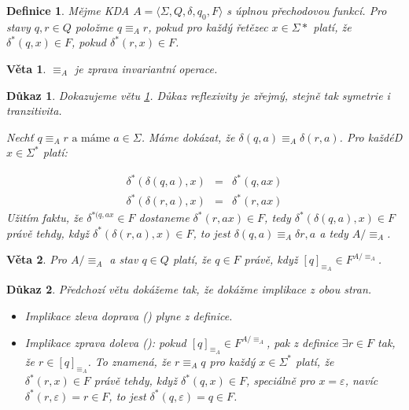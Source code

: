 \documentclass[10pt, a4paper, titlepage]{article}
\theoremstyle{note}
\newtheorem{veta}{Věta}
\newtheorem{definice}{Definice}
\newtheorem{dukaz}{Důkaz}
\begin{document}
\begin{definice}
Mějme KDA $A = \langle \Sigma, Q, \delta, q_{0}, F \rangle$ s úplnou přechodovou funkcí.
Pro stavy $q, r \in Q$ položme $q \equiv_{A} r$, pokud pro každ\'y řetězec $x \in \Sigma{*}$ plat\'i, že $\delta^{*}(q,x) \in F$,
pokud $\delta^{*}(r,x) \in F$.
\end{definice}

\begin{veta}\label{veta-zprava}
$\equiv_{A}$ je zprava invariantní operace.
\end{veta}

\begin{dukaz}
Dokazujeme větu \ref{veta-zprava}. Důkaz reflexivity je zřejm\'y, stejně tak symetrie i tranzitivita.

Nechť $q \equiv_{A} r \text{ a m\'ame } a \in \Sigma$. M\'ame dok\'azat, že $\delta(q,a) \equiv_{A} \delta(r,a)$. Pro každ\'eD
$x \in \Sigma^{*}$ plat\'i:

\begin{eqnarray*}
\delta^{*}(\delta(q,a), x) &=& \delta^{*}(q, ax) \\
\delta^{*}(\delta(r,a), x) &=& \delta^{*}(r, ax)
\end{eqnarray*}
Užit\'im faktu, že $\delta^{*(q, ax} \in F$ dostaneme $\delta^{*}(r,ax) \in F$, tedy
$\delta^{*}(\delta(q,a),x) \in F$ pr\'avě tehdy, když $\delta^{*}(\delta(r,a),x) \in F$, to jest
$\delta(q,a) \equiv_{A} \delta{r, a}$ a tedy $A/ \equiv_{A}$.
\end{dukaz}

\begin{veta}\label{veta-4}
Pro $A/ \equiv_{A}$ a stav $q \in Q$ plat\'i, že $q \in F$ pr\'avě, když $[q]_{\equiv_{A}} \in F^{A/ \equiv_{A}}$.
\end{veta}

\begin{dukaz}
Předchoz\'i větu dok\'ažeme tak, že dok\'ažme implikace z obou stran.
\begin{itemize}
\item
Implikace zleva doprava (\uv{$\Rightarrow$}) plyne z definice.

\item
Implikace zprava doleva (\uv{$\Leftarrow$}): pokud $[q]_{\equiv_{A}} \in F^{A/ \equiv_{A}}$, pak z definice
$\exists r \in F$ tak, že $r \in [q]_{\equiv_{A}}$. To znamen\'a, že $r \equiv_{A} q$ pro každ\'y $x \in \Sigma^{*}$ plat\'i, že
$\delta^{*}(r,x) \in F$ pr\'avě tehdy, když $\delta^{*}(q,x) \in F$, speci\'alně pro $x = \varepsilon$, nav\'ic
$\delta^{*}(r, \varepsilon) = r \in F$, to jest $\delta^{*}(q,\varepsilon) = q \in F$.
\end{itemize}
\end{dukaz}
\end{document}
